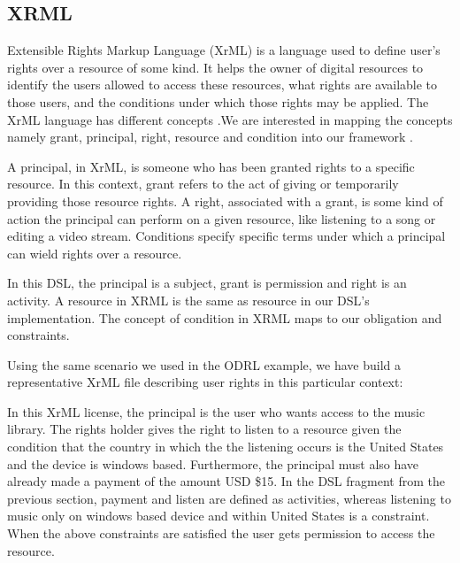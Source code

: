 \subsection{XRML}\label{sec:model-xrml}

Extensible Rights Markup Language (XrML) is a language used to define user's rights over a resource of some kind. It helps the owner of digital resources to identify the users allowed to access these resources, what rights are available to those users, and the conditions under which those rights may be applied. The XrML language has different concepts .We are interested in mapping the concepts namely grant, principal, right, resource and condition into our framework \cite{XrML-spec}.

A principal, in XrML, is someone who has been granted rights to a specific resource.  In this context, grant refers to the act of giving or temporarily providing those resource rights.  A right, associated with a grant, is some kind of action the principal can perform on a given resource, like listening to a song or editing a video stream.  Conditions specify specific terms under which a principal can wield rights over a resource.

In this DSL, the principal is a subject, grant is permission and right is an activity. A resource in XRML is the same as resource in our DSL's implementation. The concept of condition in XRML maps to our obligation and constraints.

Using the same scenario we used in the ODRL example, we have build a representative XrML file describing user rights in this particular context:



In this XrML license, the principal is the user who wants access to the music library. The rights holder gives the right to listen to a resource given the condition that the country in which the the listening occurs is the United States and the device is windows based. Furthermore, the principal must also have already made a payment of the amount USD \$15.  In the DSL fragment from the previous section, payment and listen are defined as activities, whereas listening to music only on windows based device and within United States is a constraint. When the above constraints are satisfied the user gets permission to access the resource.
